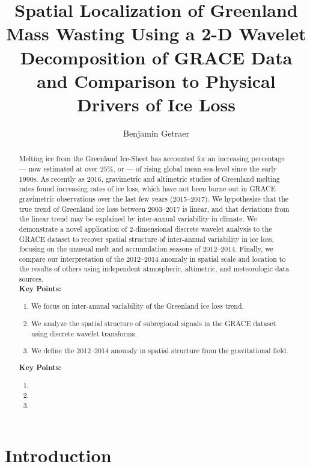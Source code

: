 \documentclass[12pt]{article}
\title{Spatial Localization of Greenland Mass Wasting Using a 2-D Wavelet Decomposition of GRACE Data and Comparison to Physical Drivers of Ice Loss}
\author{Benjamin Getraer}
\begin{document}

\maketitle

\begin{abstract}
Melting ice from the Greenland Ice-Sheet has accounted for an increasing percentage --- now estimated at over $25\%$, or --- of rising global mean sea-level since the early 1990s. As recently as 2016, gravimetric and altimetric studies of Greenland melting rates found  increasing rates of ice loss, which have not been borne out in GRACE gravimetric observations over the last few years (2015--2017). We hypothesize that the true trend of Greenland ice loss between 2003--2017 is linear, and that deviations from the linear trend may be explained by inter-annual variability in climate. We demonstrate a novel application of 2-dimensional discrete wavelet analysis to the GRACE dataset to recover spatial structure of inter-annual variability in ice loss, focusing on the unusual melt and accumulation seasons of 2012--2014. Finally, we compare our interpretation of the 2012--2014 anomaly in spatial scale and location to the results of others using independent atmospheric, altimetric, and meteorologic data sources. \\[3em]

\textbf{Key Points:}
\begin{enumerate}
	\item We focus on inter-annual variability of the Greenland ice loss trend.
	\item We analyze the spatial structure of subregional signals in the GRACE dataset using discrete wavelet transforms.
	\item We define the 2012--2014 anomaly in spatial structure from the gravitational field.
\end{enumerate}

\textbf{Key Points:}
\begin{enumerate}
	\item 
	\item 
	\item 
\end{enumerate}
\end{abstract}

\section{Introduction \label{sec:introduction}}
\end{document}
